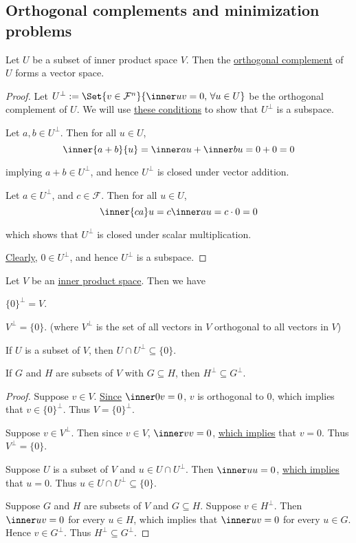 \subsection{Orthogonal complements and minimization problems}\label{c45c89a}

\label{d7186eb}

Let $U$ be a subset of inner product space $V$. Then the
\href{c3c519f}{orthogonal complement} of $U$ forms a vector space.

\begin{proof}
  \def\F{\mathcal F}

  Let $U^\perp:=\Set{v\in\F^n}{\inner uv=0,\,\forall u\in U}$ be the orthogonal
  complement of $U$. We will use \href{dea139b}{these conditions} to show that
  $U^\perp$ is a subspace.

  Let $a,b\in U^\perp$. Then for all $u\in U$,
  $$
    \inner{a+b}{u}=\inner au+\inner bu=0+0=0
  $$

  implying $a+b\in U^\perp$, and hence $U^\perp$ is closed under vector
  addition.

  Let $a\in U^\perp$, and $c\in\F$. Then for all $u\in U$,
  $$
    \inner{ca}u=c\inner au=c\cdot0=0
  $$

  which shows that $U^\perp$ is closed under scalar multiplication.

  \href{fb218c8}{Clearly}, $0\in U^\perp$, and hence $U^\perp$ is a subspace.
\end{proof}

\label{fb661b9}

Let $V$ be an \href{b9935c8}{inner product space}. Then we have
\begin{enumerata}
  \item $\{0\}^\perp=V$.
  \item $V^\perp=\{0\}$. (where $V^\perp$ is the set of all vectors in $V$
  orthogonal to all vectors in $V$)
  \item If $U$ is a subset of $V$, then $U\cap U^\perp\subseteq\{0\}$.
  \item If $G$ and $H$ are subsets of $V$ with $G\subseteq H$, then
        $H^\perp\subseteq G^\perp$.
\end{enumerata}

\begin{proof}
   Suppose $v\in V$. \href{fb218c8}{Since} $\inner 0v=0$, $v$ is
  orthogonal to $0$, which implies that $v\in\{0\}^\perp$. Thus $V=\{0\}^\perp$.

   Suppose $v\in V^\perp$. Then since $v\in V$, $\inner vv=0$,
  \href{fb218c8}{which implies} that $v=0$. Thus $V^\perp=\{0\}$.

   Suppose $U$ is a subset of $V$ and $u\in U\cap U^\perp$. Then
  $\inner uu=0$, \href{fb218c8}{which implies} that $u=0$. Thus $u\in U\cap
  U^\perp\subseteq\{0\}$.

   Suppose $G$ and $H$ are subsets of $V$ and $G\subseteq H$.
  Suppose $v\in H^\perp$. Then $\inner uv=0$ for every $u\in H$, which implies
  that $\inner uv=0$ for every $u\in G$. Hence $v\in G^\perp$. Thus
  $H^\perp\subseteq G^\perp$.
\end{proof}

